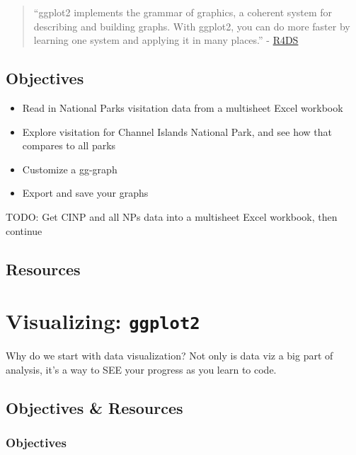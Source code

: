 \documentclass[]{book}
\providecommand{\tightlist}{%
  \setlength{\itemsep}{0pt}\setlength{\parskip}{0pt}}
\begin{document}
\begin{quote}
``ggplot2 implements the grammar of graphics, a coherent system for describing and building graphs. With ggplot2, you can do more faster by learning one system and applying it in many places.'' - \href{http://r4ds.had.co.nz/data-visualisation.html}{R4DS}
\end{quote}

\hypertarget{objectives-1}{%
\section{Objectives}\label{objectives-1}}

\begin{itemize}
\tightlist
\item
  Read in National Parks visitation data from a multisheet Excel workbook
\item
  Explore visitation for Channel Islands National Park, and see how that compares to all parks
\item
  Customize a gg-graph
\item
  Export and save your graphs
\end{itemize}

TODO: Get CINP and all NPs data into a multisheet Excel workbook, then continue

\hypertarget{resources-3}{%
\section{Resources}\label{resources-3}}

\hypertarget{visualizing-ggplot2}{%
\chapter{\texorpdfstring{Visualizing: \texttt{ggplot2}}{Visualizing: ggplot2}}\label{visualizing-ggplot2}}

Why do we start with data visualization? Not only is data viz a big part of analysis, it's a way to SEE your progress as you learn to code.

\hypertarget{objectives-resources}{%
\section{Objectives \& Resources}\label{objectives-resources}}

\hypertarget{objectives-2}{%
\subsection{Objectives}\label{objectives-2}}
\end{document}

